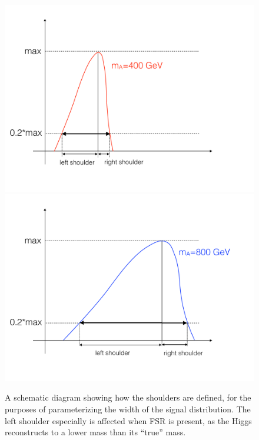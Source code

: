 \begin{figure}[hbt]
  \includegraphics[width=0.5\linewidth]{SignalKin/shoulders_400.pdf}
  \includegraphics[width=0.5\linewidth]{SignalKin/shoulders_800.pdf}
  \caption{A schematic diagram showing how the shoulders are defined,
  for the purposes of parameterizing the width of the signal distribution.
  The left shoulder especially is affected when FSR is present, as the
  Higgs reconstructs to a lower mass than its ``true'' mass.  \label{fig:shoulders}}
\end{figure}



